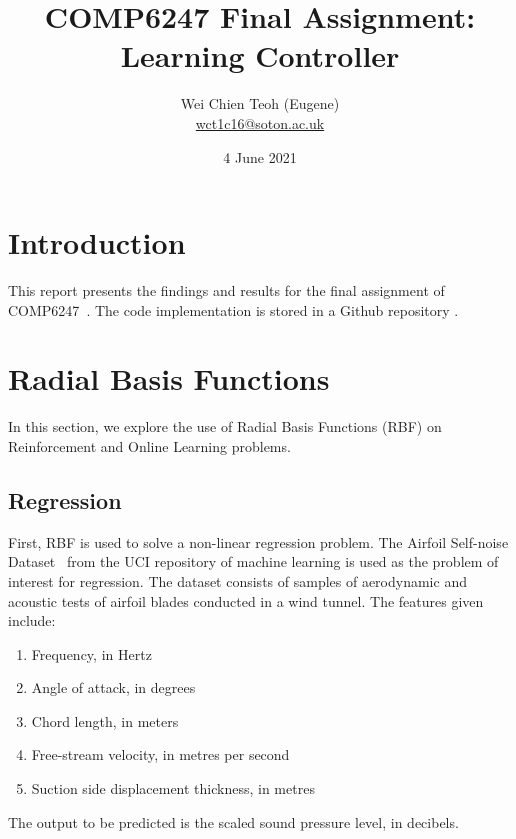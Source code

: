 \documentclass{article}
\title{COMP6247 Final Assignment: Learning Controller}
\author{Wei Chien Teoh (Eugene)\\\bigskip \href{mailto:wct1c16@soton.ac.uk}{wct1c16@soton.ac.uk}}
\date{4 June 2021}
\begin{document}
\maketitle

\section{Introduction}

This report presents the findings and results for the final assignment of COMP6247~\cite{mahesanniranjanCOMP6247202021}. The code implementation is stored in a Github repository \cite{teohEugeneteohCOMP6247ReinforcementOnlineLearning2021}.

\section{Radial Basis Functions}

In this section, we explore the use of Radial Basis Functions (RBF) on Reinforcement and Online Learning problems.

\subsection{Regression}

First, RBF is used to solve a non-linear regression problem. The Airfoil Self-noise Dataset~\cite{UCIMachineLearning} from the UCI repository of machine learning is used as the problem of interest for regression. The dataset consists of samples of aerodynamic and acoustic tests of airfoil blades conducted in a wind tunnel. The features given include:
\begin{enumerate}
    \item Frequency, in Hertz
    \item Angle of attack, in degrees
    \item Chord length, in meters
    \item Free-stream velocity, in metres per second
    \item Suction side displacement thickness, in metres
\end{enumerate}
The output to be predicted is the scaled sound pressure level, in decibels.
\end{document}
